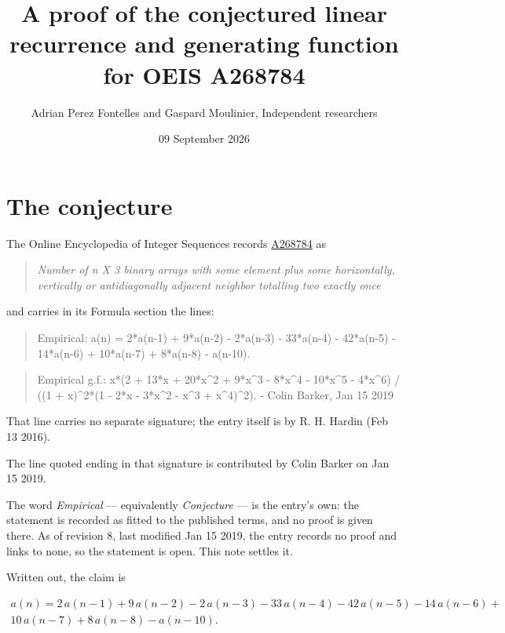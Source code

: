\documentclass[11pt]{article}
\title{A proof of the conjectured linear recurrence and generating function for OEIS A268784}
\author{Adrian Perez Fontelles and Gaspard Moulinier, Independent researchers}
\date{09 September 2026}
\theoremstyle{definition}
\begin{document}
\maketitle
\section{The conjecture}

The Online Encyclopedia of Integer Sequences records \href{https://oeis.org/A268784}{A268784} as

\begin{quote}\itshape Number of n X 3 binary arrays with some element plus some horizontally, vertically or antidiagonally adjacent neighbor totalling two exactly once\end{quote}

and carries in its Formula section the lines:

\begin{quote}\ttfamily Empirical: a(n) = 2*a(n-1) + 9*a(n-2) - 2*a(n-3) - 33*a(n-4) - 42*a(n-5) - 14*a(n-6) + 10*a(n-7) + 8*a(n-8) - a(n-10).\end{quote}

\begin{quote}\ttfamily Empirical g.f.: x*(2 + 13*x + 20*x\textasciicircum{}2 + 9*x\textasciicircum{}3 - 8*x\textasciicircum{}4 - 10*x\textasciicircum{}5 - 4*x\textasciicircum{}6) / ((1 + x)\textasciicircum{}2*(1 - 2*x - 3*x\textasciicircum{}2 - x\textasciicircum{}3 + x\textasciicircum{}4)\textasciicircum{}2). - Colin Barker, Jan 15 2019\end{quote}

That line carries no separate signature; the entry itself is by R. H. Hardin (Feb 13 2016).

The line quoted ending in that signature is contributed by Colin Barker on Jan 15 2019.

The word {\itshape Empirical} --- equivalently {\itshape Conjecture} --- is the entry's own: the statement is recorded as fitted to the published terms, and no proof is given there. As of revision 8, last modified Jan 15 2019, the entry records no proof and links to none, so the statement is open. This note settles it.

Written out, the claim is

\begin{multline*} a(n) = 2\,a(n-1) + 9\,a(n-2) - 2\,a(n-3) - 33\,a(n-4) - 42\,a(n-5) - 14\,a(n-6) + \\ 10\,a(n-7) + 8\,a(n-8) - a(n-10). \end{multline*}
\end{document}
